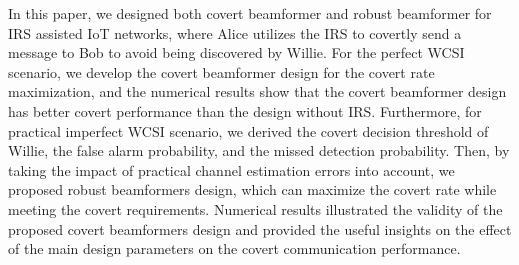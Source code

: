 \documentclass[10pt,journal,letterpaper,twocolumn,twoside]{IEEEtran} %
\begin{document}
In this paper, we designed  both covert beamformer   and robust beamformer    for IRS assisted IoT networks, where Alice utilizes the IRS to covertly send a message to Bob to avoid being discovered by Willie.
  For the   perfect WCSI scenario, we develop  the  covert beamformer design for the    covert rate maximization, and the numerical results show that the  covert beamformer design has better covert performance than the design without IRS.
Furthermore, for practical   imperfect WCSI scenario,
 we derived
 the covert decision threshold of Willie, the false alarm
probability, and the missed detection probability.
Then,
 by taking the impact of practical channel estimation errors into account,   we  proposed   robust beamformers design,
which can maximize the covert rate   while meeting the covert requirements.
 Numerical results illustrated the validity of the proposed covert  beamformers design and
provided the useful insights on the effect of the main   design  parameters
on the covert communication   performance.
\end{document}

